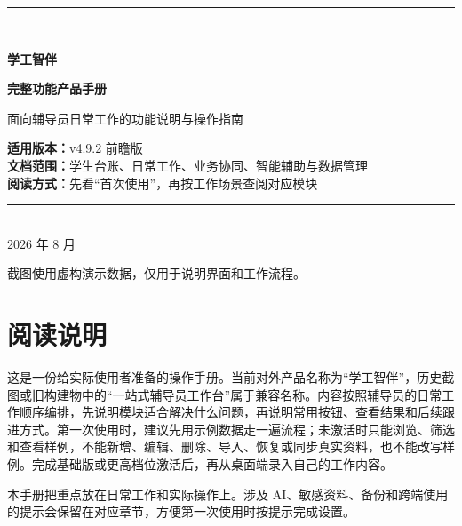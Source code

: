 \documentclass[UTF8,zihao=-4,oneside]{ctexrep}
\newcommand{\productname}{学工智伴}
\newcommand{\version}{v4.9.2 前瞻版}
\begin{document}
\begin{titlepage}
  \thispagestyle{empty}
  \vspace*{20mm}
  \begin{center}
    {\color{CWBblue}\rule{0.72\textwidth}{1.3pt}}\\[12mm]
    {\Huge\bfseries\color{CWBink} \productname\par}
    \vspace{7mm}
    {\LARGE\bfseries 完整功能产品手册\par}
    \vspace{8mm}
    {\large\color{CWBgray}面向辅导员日常工作的功能说明与操作指南\par}
    \vfill
    \begin{tcolorbox}[width=0.78\textwidth,colback=CWBfill,colframe=CWBline,boxrule=0.5pt,arc=1.5mm]
      \centering
      \large
      \textbf{适用版本：}\version\\[4pt]
      \textbf{文档范围：}学生台账、日常工作、业务协同、智能辅助与数据管理\\[4pt]
      \textbf{阅读方式：}先看“首次使用”，再按工作场景查阅对应模块
    \end{tcolorbox}
    \vfill
    {\color{CWBgray}\rule{0.72\textwidth}{0.4pt}}\\[5mm]
    {\large 2026 年 8 月}\par
    \vspace{4mm}
    {\small\color{CWBgray}截图使用虚构演示数据，仅用于说明界面和工作流程。}
  \end{center}
\end{titlepage}

\chapter*{阅读说明}

这是一份给实际使用者准备的操作手册。当前对外产品名称为“学工智伴”，历史截图或旧构建物中的“一站式辅导员工作台”属于兼容名称。内容按照辅导员的日常工作顺序编排，先说明模块适合解决什么问题，再说明常用按钮、查看结果和后续跟进方式。第一次使用时，建议先用示例数据走一遍流程；未激活时只能浏览、筛选和查看样例，不能新增、编辑、删除、导入、恢复或同步真实资料，也不能改写样例。完成基础版或更高档位激活后，再从桌面端录入自己的工作内容。

\begin{infobox}
本手册把重点放在日常工作和实际操作上。涉及 AI、敏感资料、备份和跨端使用的提示会保留在对应章节，方便第一次使用时按提示完成设置。
\end{infobox}
\end{document}
